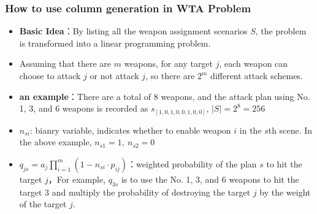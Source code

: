 \documentclass[CJK,10pt]{beamer}
\begin{document}
\begin{frame}
    \frametitle{How to use column generation in WTA Problem}
    \begin{itemize}
		\item \textbf{Basic Idea}：By listing all the weapon assignment scenarios $S$, the problem is transformed into a linear programming problem.
		\item Assuming that there are $m$ weapons, for any target $j$, each weapon can choose to attack $j$ or not attack $j$, so there are $2^m$ different attack schemes.
		\item \textbf{an example}：There are a total of 8 weapons, and the attack plan using No. 1, 3, and 6 weapons is recorded as $s_{[1,0,1,0,0,1,0,0]}$, $|S| = 2^8 = 256$
		\item $n_{si}$: bianry variable, indicates whether to enable weapon $i$ in the $s$th scene. In the above example, $n_{s1} = 1,\ n_{s2} = 0$
		\item $q_{js} = a_j \prod_{i = 1}^m (1 - n_{si}\cdot p_{ij})$：weighted probability of the plan $s$ to hit the target $j$，For example, $q_{3s}$ is to use the No. 1, 3, and 6 weapons to hit the target $3$ and multiply the probability of destroying the target $j$ by the weight of the target $j$.
	\end{itemize}
\end{frame}
\end{document}
